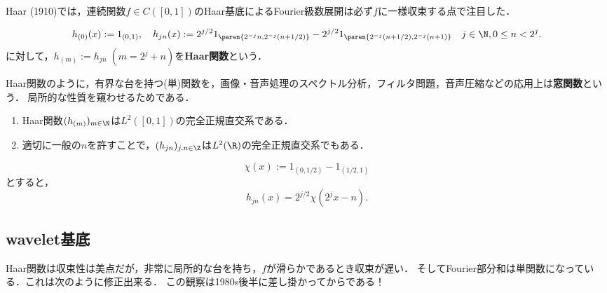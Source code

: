 \documentclass[uplatex,dvipdfmx]{jsreport}
\begin{document}
\begin{tcolorbox}[colframe=ForestGreen, colback=ForestGreen!10!white,breakable,colbacktitle=ForestGreen!40!white,coltitle=black,fonttitle=\bfseries\sffamily,
title=]
    Haar (1910)では，連続関数$f\in C([0,1])$のHaar基底によるFourier級数展開は必ず$f$に一様収束する点で注目した．
\end{tcolorbox}

\begin{definition}
    \[h_{(0)}(x):=1_{(0,1)},\quad h_{jn}(x):=2^{j/2}1_{\paren{2^{-j}n,2^{-j}(n+1/2)}}-2^{j/2}1_{\paren{2^{-j}(n+1/2),2^{-j}(n+1)}}\quad j\in\N,0\le n<2^j.\]
    に対して，$h_{(m)}:=h_{jn}\;(m=2^j+n)$を\textbf{Haar関数}という．
\end{definition}
\begin{remarks}
    Haar関数のように，有界な台を持つ(単)関数を，画像・音声処理のスペクトル分析，フィルタ問題，音声圧縮などの応用上は\textbf{窓関数}という．
    局所的な性質を窺わせるためである．
\end{remarks}

\begin{proposition}\mbox{}
    \begin{enumerate}
        \item Haar関数$(h_{(m)})_{m\in\N}$は$L^2([0,1])$の完全正規直交系である．
        \item 適切に一般の$n$を許すことで，$(h_{jn})_{j,n\in\Z}$は$L^2(\R)$の完全正規直交系でもある．
    \end{enumerate}
\end{proposition}

\begin{proposition}
    \[\chi(x):=1_{(0,1/2)}-1_{(1/2,1)}\]
    とすると，
    \[h_{jn}(x)=2^{j/2}\chi(2^jx-n).\]
\end{proposition}

\subsection{wavelet基底}

\begin{tcolorbox}[colframe=ForestGreen, colback=ForestGreen!10!white,breakable,colbacktitle=ForestGreen!40!white,coltitle=black,fonttitle=\bfseries\sffamily,
title=]
    Haar関数は収束性は美点だが，非常に局所的な台を持ち，$f$が滑らかであるとき収束が遅い．
    そしてFourier部分和は単関数になっている．これは次のように修正出来る．
    この観察は1980s後半に差し掛かってからである！
\end{tcolorbox}
\end{document}
